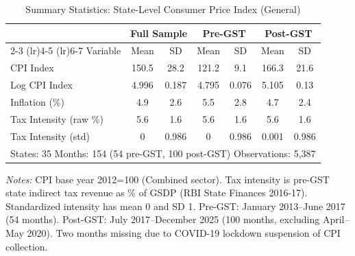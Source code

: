 \begin{table}[htbp]
\centering
\caption{Summary Statistics: State-Level Consumer Price Index (General)}
\label{tab:summary}
\begin{tabular}{lcccccc}
\toprule
& \multicolumn{2}{c}{Full Sample} & \multicolumn{2}{c}{Pre-GST} & \multicolumn{2}{c}{Post-GST} \\
\cmidrule(lr){2-3} \cmidrule(lr){4-5} \cmidrule(lr){6-7}
Variable & Mean & SD & Mean & SD & Mean & SD \\
\midrule
CPI Index & 150.5 & 28.2 & 121.2 & 9.1 & 166.3 & 21.6 \\
Log CPI Index & 4.996 & 0.187 & 4.795 & 0.076 & 5.105 & 0.13 \\
Inflation (\%) & 4.9 & 2.6 & 5.5 & 2.8 & 4.7 & 2.4 \\
Tax Intensity (raw \%) & 5.6 & 1.6 & 5.6 & 1.6 & 5.6 & 1.6 \\
Tax Intensity (std) & 0 & 0.986 & 0 & 0.986 & 0.001 & 0.986 \\
\midrule
\multicolumn{7}{l}{States: 35 \quad Months: 154 (54 pre-GST, 100 post-GST) \quad Observations: 5,387} \\
\bottomrule
\end{tabular}
\begin{tablenotes}[flushleft]\small
\item \textit{Notes:} CPI base year 2012=100 (Combined sector). Tax intensity is pre-GST state indirect tax revenue as \% of GSDP (RBI State Finances 2016-17). Standardized intensity has mean 0 and SD 1. Pre-GST: January 2013--June 2017 (54 months). Post-GST: July 2017--December 2025 (100 months, excluding April--May 2020). Two months missing due to COVID-19 lockdown suspension of CPI collection.
\end{tablenotes}
\end{table}
